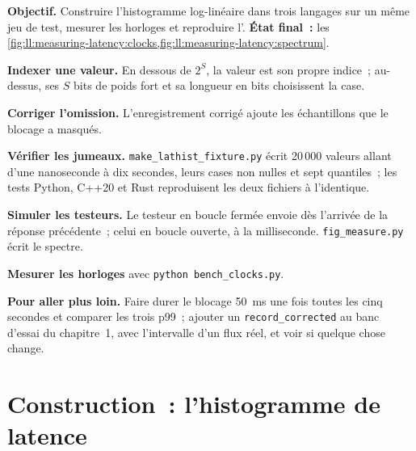 \begin{tutorial}
\textbf{Objectif.} Construire l'histogramme log-linéaire dans trois langages sur un même jeu de test, mesurer les horloges et reproduire
l'. \textbf{État final~:} les \cref{fig:ll:measuring-latency:clocks,fig:ll:measuring-latency:spectrum}.
\begin{tutsteps}
\item \textbf{Indexer une valeur.} En dessous de $2^S$, la valeur est son propre indice~; au-dessus, ses $S$ bits de poids fort et sa longueur en bits choisissent la
case.
\label{lst:ll:measuring-latency:index}
\item \textbf{Corriger l'omission.} L'enregistrement corrigé ajoute les échantillons que le blocage a masqués.
\label{lst:ll:measuring-latency:corrected}
\item \textbf{Vérifier les jumeaux.} \texttt{make\_lathist\_fixture.py} écrit 20\,000 valeurs allant d'une nanoseconde à dix secondes,
leurs cases non nulles et sept quantiles~; les tests Python, C++20 et Rust reproduisent les deux fichiers à l'identique.
\item \textbf{Simuler les testeurs.} Le testeur en boucle fermée envoie dès l'arrivée de la réponse précédente~; celui en boucle ouverte, à la
milliseconde. \texttt{fig\_measure.py} écrit le spectre.
\label{lst:ll:measuring-latency:closed}
\item \textbf{Mesurer les horloges} avec \texttt{python bench\_clocks.py}.
\end{tutsteps}
\textbf{Pour aller plus loin.} Faire durer le blocage \qty{50}{\milli\second} une fois toutes les cinq secondes et comparer les trois
p99~; ajouter un \texttt{record\_corrected} au banc d'essai du chapitre~1, avec l'intervalle d'un flux réel, et voir si quelque chose
change.
\end{tutorial}

\section{Construction~: l'histogramme de latence}\label{bld:ll:measuring-latency:lathist}

